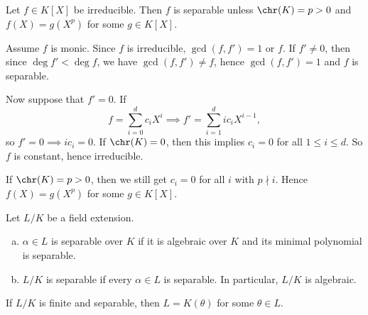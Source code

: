 \documentclass[12pt]{article}
\begin{document}
\begin{theorem}
	Let $f \in K[X]$ be irreducible. Then $f$ is separable unless $\chr(K) = p > 0$ and $f(X) = g(X^p)$ for some $g \in K[X]$.
\end{theorem}

\begin{proofbox}
	Assume $f$ is monic. Since $f$ is irreducible, $\gcd(f, f') = 1$ or $f$. If $f' \neq 0$, then since $\deg f' < \deg f$, we have $\gcd(f, f') \neq f$, hence $\gcd(f, f') = 1$ and $f$ is separable.

	Now suppose that $f' = 0$. If
	\[
	f = \sum_{i = 0}^{d} c_i X^i \implies f' = \sum_{i = 1}^{d} ic_i X^{i-1},
	\]
	so $f' = 0 \implies i c_i = 0$. If $\chr(K) = 0$, then this implies $c_i = 0$ for all $1 \leq i \leq d$. So $f$ is constant, hence irreducible.

	If $\chr(K) = p > 0$, then we still get $c_i = 0$ for all $i$ with $p \nmid i$. Hence $f(X) = g(X^p)$ for some $g \in K[X]$.
\end{proofbox}

\begin{definition}
	Let $L/K$ be a field extension.
	\begin{enumerate}[(a)]
		\item $\alpha \in L$ is separable over $K$ if it is algebraic over $K$ and its minimal polynomial is separable.
		\item $L/K$ is separable if every $\alpha \in L$ is separable. In particular, $L/K$ is algebraic.
	\end{enumerate}
\end{definition}

\begin{theorem}\label{thm:prim_elt}
	If $L/K$ is finite and separable, then $L = K(\theta)$ for some $\theta \in L$.
\end{theorem}
\end{document}
